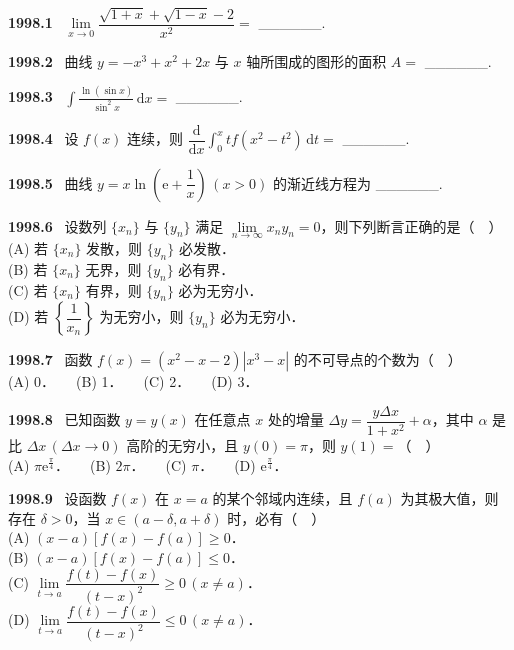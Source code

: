 \documentclass[UTF8,12pt]{ctexart}
\newcommand{\qn}[1]{\textbf{\large #1}\ }
\begin{document}
\qn{1998.1}
$\lim\limits_{x\to 0}\dfrac{\sqrt{1+x}+\sqrt{1-x}-2}{x^2}=$ ______.

\vfill
\newpage
\qn{1998.2}
曲线 $y=-x^3+x^2+2x$ 与 $x$ 轴所围成的图形的面积 $A=$ ______.

\vfill
\newpage
\qn{1998.3}
$\displaystyle\int\frac{\ln(\sin x)}{\sin^2 x}\,\mathrm{d}x=$ ______.

\vfill
\newpage
\qn{1998.4}
设 $f(x)$ 连续，则 $\dfrac{\mathrm{d}}{\mathrm{d}x}\displaystyle\int_0^x tf(x^2-t^2)\,\mathrm{d}t=$ ______.

\vfill
\newpage
\qn{1998.5}
曲线 $y=x\ln\left(\mathrm{e}+\dfrac{1}{x}\right)\,(x>0)$ 的渐近线方程为 ______.

\vfill
\newpage
\qn{1998.6}
设数列 $\{x_n\}$ 与 $\{y_n\}$ 满足 $\lim\limits_{n\to\infty}x_ny_n=0$，则下列断言正确的是（　）
\\
\noindent (A) 若 $\{x_n\}$ 发散，则 $\{y_n\}$ 必发散．
\\
\noindent (B) 若 $\{x_n\}$ 无界，则 $\{y_n\}$ 必有界．
\\
\noindent (C) 若 $\{x_n\}$ 有界，则 $\{y_n\}$ 必为无穷小．
\\
\noindent (D) 若 $\left\{\dfrac{1}{x_n}\right\}$ 为无穷小，则 $\{y_n\}$ 必为无穷小．

\vfill
\newpage
\qn{1998.7}
函数 $f(x)=(x^2-x-2)|x^3-x|$ 的不可导点的个数为（　）
\\
\noindent (A) 0．　　(B) 1．　　(C) 2．　　(D) 3．

\vfill
\newpage
\qn{1998.8}
已知函数 $y=y(x)$ 在任意点 $x$ 处的增量 $\Delta y=\dfrac{y\Delta x}{1+x^2}+\alpha$，其中 $\alpha$ 是比 $\Delta x\,(\Delta x\to 0)$ 高阶的无穷小，且 $y(0)=\pi$，则 $y(1)=$（　）
\\
\noindent (A) $\pi\mathrm{e}^{\frac{\pi}{4}}$．　　(B) $2\pi$．　　(C) $\pi$．　　(D) $\mathrm{e}^{\frac{\pi}{4}}$．

\vfill
\newpage
\qn{1998.9}
设函数 $f(x)$ 在 $x=a$ 的某个邻域内连续，且 $f(a)$ 为其极大值，则存在 $\delta>0$，当 $x\in(a-\delta,a+\delta)$ 时，必有（　）
\\
\noindent (A) $(x-a)[f(x)-f(a)]\geqslant 0$．
\\
\noindent (B) $(x-a)[f(x)-f(a)]\leqslant 0$．
\\
\noindent (C) $\lim\limits_{t\to a}\dfrac{f(t)-f(x)}{(t-x)^2}\geqslant 0\,(x\neq a)$．
\\
\noindent (D) $\lim\limits_{t\to a}\dfrac{f(t)-f(x)}{(t-x)^2}\leqslant 0\,(x\neq a)$．
\end{document}

